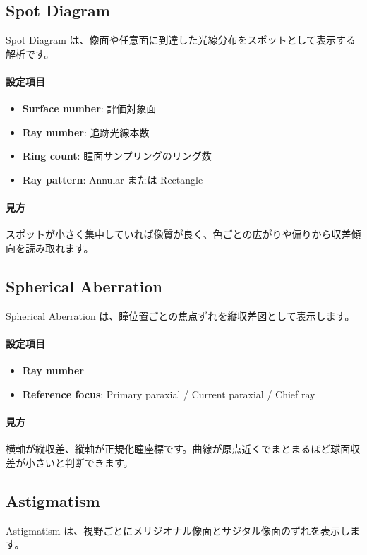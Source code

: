 \documentclass[11pt]{article}
\begin{document}
\subsection{Spot Diagram}
Spot Diagram は、像面や任意面に到達した光線分布をスポットとして表示する解析です。

\paragraph{設定項目}
\begin{itemize}
  \item \textbf{Surface number}: 評価対象面
  \item \textbf{Ray number}: 追跡光線本数
  \item \textbf{Ring count}: 瞳面サンプリングのリング数
  \item \textbf{Ray pattern}: Annular または Rectangle
\end{itemize}

\paragraph{見方}
スポットが小さく集中していれば像質が良く、色ごとの広がりや偏りから収差傾向を読み取れます。

\subsection{Spherical Aberration}
Spherical Aberration は、瞳位置ごとの焦点ずれを縦収差図として表示します。

\paragraph{設定項目}
\begin{itemize}
  \item \textbf{Ray number}
  \item \textbf{Reference focus}: Primary paraxial / Current paraxial / Chief ray
\end{itemize}

\paragraph{見方}
横軸が縦収差、縦軸が正規化瞳座標です。曲線が原点近くでまとまるほど球面収差が小さいと判断できます。

\subsection{Astigmatism}
Astigmatism は、視野ごとにメリジオナル像面とサジタル像面のずれを表示します。
\end{document}
